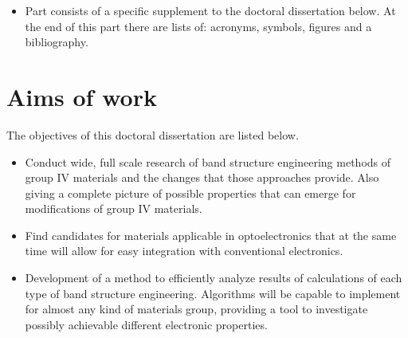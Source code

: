 \begin{itemize}
\begin{itemize}
	\end{itemize}
	\item Part \hyperref[part:IV]{} consists of a specific supplement to the doctoral dissertation below.
	At the end of this part there are lists of: acronyms, symbols, figures and a bibliography. 
\end{itemize}

\ornament


\section*{Aims of work}

The objectives of this doctoral dissertation are listed below. 
\begin{itemize}

    \item Conduct wide, full scale research of band structure engineering methods of group IV materials and the changes that those approaches provide. Also giving a complete picture of possible properties that can emerge for modifications of group IV materials.
    
    \item Find candidates for materials applicable in optoelectronics that at the same time will allow for easy integration with conventional electronics.
    
    \item Development of a method to efficiently analyze results of calculations of each type of band structure engineering. Algorithms will be capable to implement for almost any kind of materials group, providing a tool to investigate possibly achievable different electronic properties.
\end{itemize}

\ornament